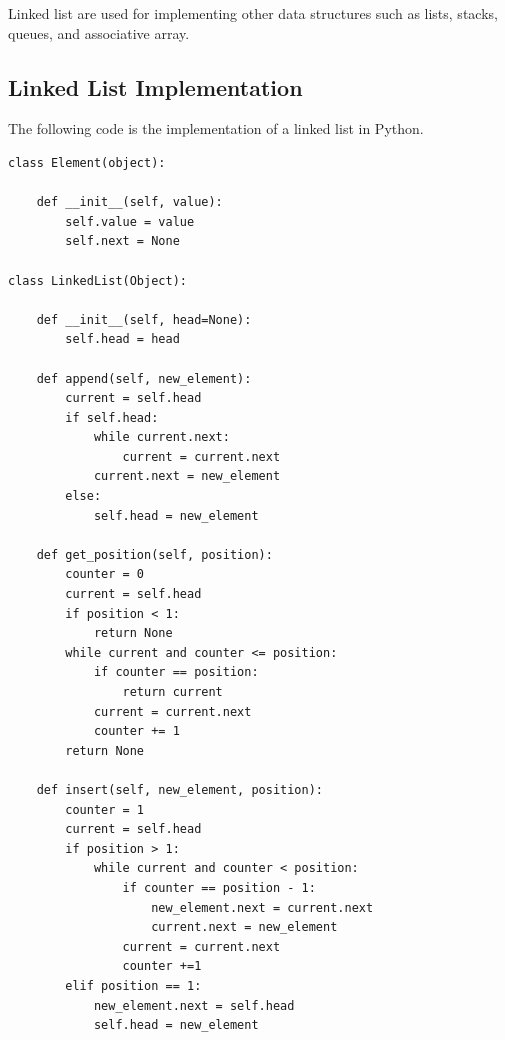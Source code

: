 Linked list are used for implementing other data structures such as lists, stacks, queues, and associative array.

\subsection{Linked List Implementation}
The following code is the implementation of a linked list in Python.
\begin{lstlisting}[firstnumber=1, caption={Linked List implementation.}]
class Element(object):

	def __init__(self, value):
		self.value = value
		self.next = None
		
class LinkedList(Object):

	def __init__(self, head=None):
		self.head = head
		
	def append(self, new_element):
		current = self.head
		if self.head:
			while current.next:
				current = current.next
			current.next = new_element
		else:
			self.head = new_element
	
	def get_position(self, position):
		counter = 0
		current = self.head
		if position < 1:
			return None
		while current and counter <= position:
			if counter == position:
				return current
			current = current.next
			counter += 1
		return None
	
	def insert(self, new_element, position):
		counter = 1
		current = self.head
		if position > 1:
			while current and counter < position:
				if counter == position - 1:
					new_element.next = current.next
					current.next = new_element
				current = current.next
				counter +=1 
		elif position == 1:
			new_element.next = self.head
			self.head = new_element
\end{lstlisting}

